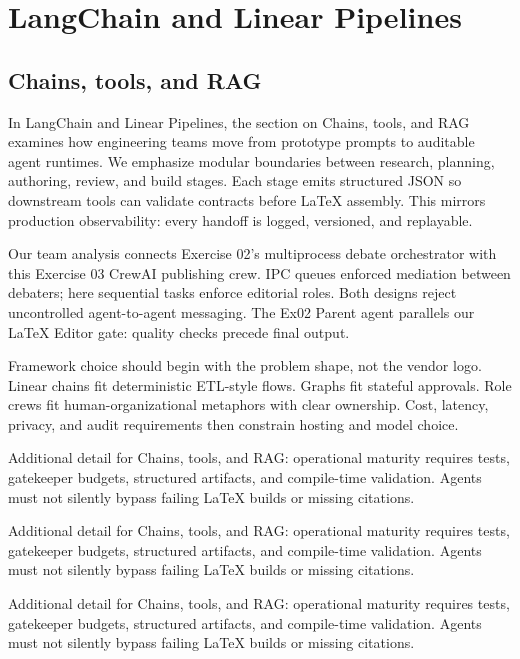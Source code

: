 \section{LangChain and Linear Pipelines}

\subsection{Chains, tools, and RAG}
In LangChain and Linear Pipelines, the section on Chains, tools, and RAG examines how engineering teams move from prototype prompts to auditable agent runtimes. We emphasize modular boundaries between research, planning, authoring, review, and build stages. Each stage emits structured JSON so downstream tools can validate contracts before LaTeX assembly. This mirrors production observability: every handoff is logged, versioned, and replayable. \cite{crewai2024} \cite{langgraph2024}

Our team analysis connects Exercise 02's multiprocess debate orchestrator with this Exercise 03 CrewAI publishing crew. IPC queues enforced mediation between debaters; here sequential tasks enforce editorial roles. Both designs reject uncontrolled agent-to-agent messaging. The Ex02 Parent agent parallels our LaTeX Editor gate: quality checks precede final output. \cite{crewai2024} \cite{langgraph2024}

Framework choice should begin with the problem shape, not the vendor logo. Linear chains fit deterministic ETL-style flows. Graphs fit stateful approvals. Role crews fit human-organizational metaphors with clear ownership. Cost, latency, privacy, and audit requirements then constrain hosting and model choice. \cite{crewai2024} \cite{langgraph2024}

Additional detail for Chains, tools, and RAG: operational maturity requires tests, gatekeeper budgets, structured artifacts, and compile-time validation. Agents must not silently bypass failing LaTeX builds or missing citations. \cite{crewai2024} \cite{langgraph2024}

Additional detail for Chains, tools, and RAG: operational maturity requires tests, gatekeeper budgets, structured artifacts, and compile-time validation. Agents must not silently bypass failing LaTeX builds or missing citations. \cite{crewai2024} \cite{langgraph2024}

Additional detail for Chains, tools, and RAG: operational maturity requires tests, gatekeeper budgets, structured artifacts, and compile-time validation. Agents must not silently bypass failing LaTeX builds or missing citations. \cite{crewai2024} \cite{langgraph2024}

